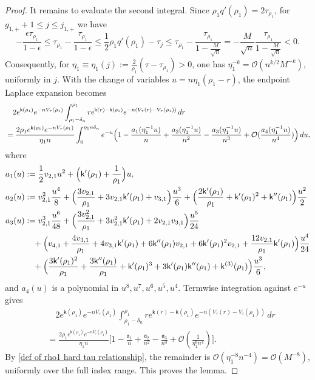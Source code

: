 \documentclass[10pt,a4paper]{amsart}
\begin{document}
\begin{proof}
It remains to evaluate the second integral. Since $\rho_1q'(\rho_1)=2\tau_{\rho_1}$, for $g_{1,+}+1\leq j\leq j_{1,+}$ we have
\begin{equation}
\label{def of rho1 hard tau relationship}
-\frac{\epsilon\tau_{\rho_1}}{1-\epsilon}
\leq
\tau_{\rho_1}-\frac{\tau_{\rho_1}}{1-\epsilon}
\leq
\frac{1}{2}\rho_1q'(\rho_1)-\tau_j
\leq \tau_{\rho_1}-\frac{\tau_{\rho_1}}{1-\frac{M}{\sqrt{n}}}
=
-\frac{M}{\sqrt{n}}\frac{\tau_{\rho_1}}{1-\frac{M}{\sqrt{n}}}<0.
\end{equation}
Consequently, for $\eta_1\equiv\eta_1(j):=\frac{2}{\rho_1}(\tau-\tau_{\rho_1})>0$, one has $\eta_1^{-k}=\mathcal{O}(n^{k/2}M^{-k})$, uniformly in $j$. With the change of variables $u=n\eta_1(\rho_1-r)$, the endpoint Laplace expansion becomes
\begin{align*}
&\quad 2e^{\mathsf{k}(\rho_1)}e^{-nV_{\tau}(\rho_1)}\int_{\rho_1-\delta_n}^{\rho_1}re^{\mathsf{k}(r)-\mathsf{k}(\rho_1)}e^{-n(V_{\tau}(r)-V_{\tau}(\rho_1))}\,dr
\\
&=
\frac{2\rho_1e^{\mathsf{k}(\rho_1)}e^{-nV_{\tau}(\rho_1)}}{\eta_1 n}\int_0^{\eta_1n\delta_n}
e^{-u}
\Bigl(1-\frac{a_1(\eta_1^{-1}u)}{n}+\frac{a_2(\eta_1^{-1}u)}{n^2}-\frac{a_3(\eta_1^{-1}u)}{n^3}+\mathcal{O}(\frac{a_4(\eta_1^{-1}u)}{n^4})\Bigr)
\,du,
\end{align*}
where 
\begin{align*}
a_1(u)&:=\frac{1}{2}v_{2,1}u^2+\Bigl(\mathsf{k}'(\rho_1)+\frac{1}{\rho_1}\Bigr)u,
\\
a_2(u)&:=v_{2,1}^2\frac{u^4}{8}+\Bigl(\frac{3v_{2,1}}{\rho_1}+3v_{2,1}\mathsf{k}'(\rho_1)+v_{3,1}\Bigr)\frac{u^3}{6}
+\Bigl(\frac{2\mathsf{k}'(\rho_1)}{\rho_1}+\mathsf{k}'(\rho_1)^2+\mathsf{k}''(\rho_1)\Bigr)\frac{u^2}{2}
\\
a_3(u)&:=v_{2,1}^3\frac{u^6}{48}
+\Bigl(\frac{3v_{2,1}^2}{\rho_1}+3v_{2,1}^2\mathsf{k}'(\rho_1)+2v_{2,1}v_{3,1}\Bigr)\frac{u^5}{24}
\\
&\quad
+\Bigl(v_{4,1}+\frac{4v_{3,1}}{\rho_1}+4v_{3,1}\mathsf{k}'(\rho_1)+6\mathsf{k}''(\rho_1)v_{2,1}+6\mathsf{k}'(\rho_1)^2v_{2,1}+\frac{12v_{2,1}}{\rho_1}\mathsf{k}'(\rho_1)\Bigr)\frac{u^4}{24}
\\
&\quad
+\Bigl(\frac{3\mathsf{k}'(\rho_1)^2}{\rho_1}+\frac{3\mathsf{k}''(\rho_1)}{\rho_1}+\mathsf{k}'(\rho_1)^3+3\mathsf{k}'(\rho_1)\mathsf{k}''(\rho_1)+\mathsf{k}^{(3)}(\rho_1)\Bigr)
\frac{u^3}{6},
\end{align*}
and $a_4(u)$ is a polynomial in $u^8,u^7,u^6,u^5,u^4$. Termwise integration against $e^{-u}$ gives
\begin{align*}
&\quad 2e^{\mathsf{k}(\rho_1)}e^{-nV_{\tau}(\rho_1)}\int_{\rho_1-\delta_n}^{\rho_1}re^{\mathsf{k}(r)-\mathsf{k}(\rho_1)}e^{-n(V_{\tau}(r)-V_{\tau}(\rho_1))}\,dr
\\
&=
\frac{2\rho_1e^{\mathsf{k}(\rho_1)}e^{-nV_{\tau}(\rho_1)}}{\eta_1 n}
\bigg[1-\frac{\mathfrak{a}_1}{n}+\frac{\mathfrak{a}_2}{n^2}-\frac{\mathfrak{a}_3}{n^3}+\mathcal{O}(\frac{1}{\eta_1^8n^4})\bigg]. 
\end{align*}
By \eqref{def of rho1 hard tau relationship}, the remainder is $\mathcal{O}(\eta_1^{-8}n^{-4})=\mathcal{O}(M^{-8})$, uniformly over the full index range. This proves the lemma.


\end{proof}
\end{document}
